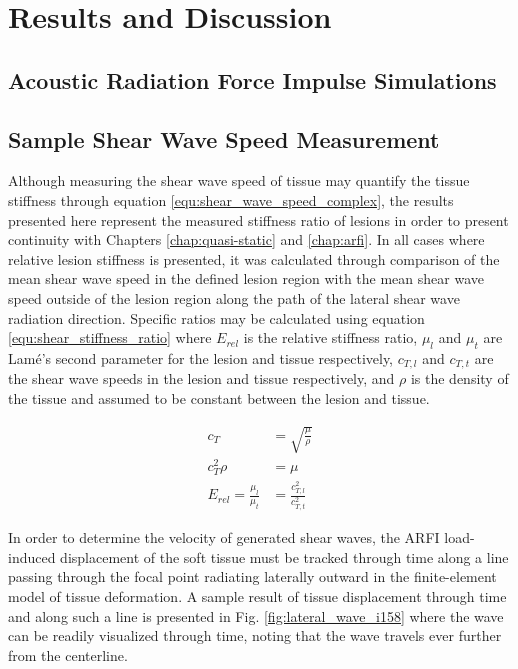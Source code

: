 
	\section{Results and Discussion}
	\label{sec:shear_results}
		\subsection{Acoustic Radiation Force Impulse Simulations}

		\subsection{Sample Shear Wave Speed Measurement}
		\label{subsec:shear_results_sample_wave_speed}
			Although measuring the shear wave speed of tissue may quantify the tissue stiffness through equation \ref{equ:shear_wave_speed_complex}, the results presented here represent the measured stiffness ratio of lesions in order to present continuity with Chapters \ref{chap:quasi-static} and \ref{chap:arfi}. In all cases where relative lesion stiffness is presented, it was calculated through comparison of the mean shear wave speed in the defined lesion region with the mean shear wave speed outside of the lesion region along the path of the lateral shear wave radiation direction. Specific ratios may be calculated using equation \ref{equ:shear_stiffness_ratio} where $E_{rel}$ is the relative stiffness ratio, $\mu_l$ and $\mu_t$ are Lam\'{e}'s second parameter for the lesion and tissue respectively, $c_{T,l}$ and $c_{T,t}$ are the shear wave speeds in the lesion and tissue respectively, and $\rho$ is the density of the tissue and assumed to be constant between the lesion and tissue.

			\begin{subequations}
				\label{equ:shear_stiffness_ratio}
				\begin{align}
					c_T &= \sqrt{\frac{\mu}{\rho}} \\
					c_T^2\rho &= \mu \\
					E_{rel} = \frac{\mu_l}{\mu_t} &= \frac{c_{T,l}^2}{c_{T,t}^2}
				\end{align}
			\end{subequations}

			In order to determine the velocity of generated shear waves, the ARFI load-induced displacement of the soft tissue must be tracked through time along a line passing through the focal point radiating laterally outward in the finite-element model of tissue deformation. A sample result of tissue displacement through time and along such a line is presented in Fig. \ref{fig:lateral_wave_i158} where the wave can be readily visualized through time, noting that the wave travels ever further from the centerline.

